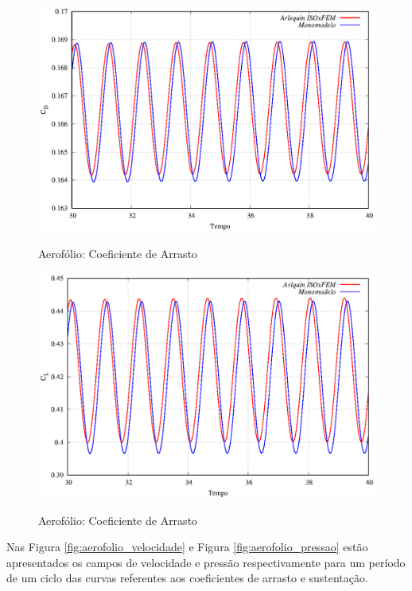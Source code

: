 \begin{figure}[!htbp]
	\caption{Aerofólio: Coeficiente de Arrasto}
	\centering 
	{\includegraphics[scale=0.8,trim=0cm 0cm 0cm 0cm, clip=true]{Imagens/Cap6/aerofolio_CD.eps}}	
	\label{fig:aerofolio_CD}
\end{figure}

\begin{figure}[!htbp]
	\caption{Aerofólio: Coeficiente de Arrasto}
	\centering 
	\includegraphics[scale=0.8,trim=0cm 0cm 0cm 0cm, clip=true]{Imagens/Cap6/aerofolio_CL.eps}	
	\label{fig:aerofolio_CL}
\end{figure}

Nas Figura \ref{fig:aerofolio_velocidade} e Figura \ref{fig:aerofolio_pressao} estão apresentados os campos de velocidade e pressão respectivamente para um período de um ciclo das curvas referentes aos coeficientes de arrasto e sustentação. 

